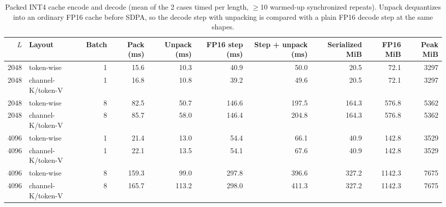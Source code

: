 \begin{table}[!htb]
\centering
\scriptsize
\setlength{\tabcolsep}{3.5pt}
\caption{Packed INT4 cache encode and decode (mean of the 2 cases timed per length, $\geq$10 warmed-up synchronized repeats). Unpack dequantizes into an ordinary FP16 cache before SDPA, so the decode step with unpacking is compared with a plain FP16 decode step at the same shapes.}
\label{tab:t2ccodec}
\begin{adjustbox}{max width=\linewidth}
\begin{tabular}{rlrrrrrrrr}
\toprule
$L$ & Layout & Batch & Pack (ms) & Unpack (ms) & FP16 step (ms) & Step + unpack (ms) & Serialized MiB & FP16 MiB & Peak MiB \\
\midrule
2048 & token-wise & 1 & 15.6 & 10.3 & 40.9 & 50.0 & 20.5 & 72.1 & 3297 \\
2048 & channel-K/token-V & 1 & 16.8 & 10.8 & 39.2 & 49.6 & 20.5 & 72.1 & 3297 \\
2048 & token-wise & 8 & 82.5 & 50.7 & 146.6 & 197.5 & 164.3 & 576.8 & 5362 \\
2048 & channel-K/token-V & 8 & 85.7 & 58.0 & 146.4 & 204.8 & 164.3 & 576.8 & 5362 \\
4096 & token-wise & 1 & 21.4 & 13.0 & 54.4 & 66.1 & 40.9 & 142.8 & 3529 \\
4096 & channel-K/token-V & 1 & 22.1 & 13.5 & 54.1 & 67.6 & 40.9 & 142.8 & 3529 \\
4096 & token-wise & 8 & 159.3 & 99.0 & 297.8 & 396.6 & 327.2 & 1142.3 & 7675 \\
4096 & channel-K/token-V & 8 & 165.7 & 113.2 & 298.0 & 411.3 & 327.2 & 1142.3 & 7675 \\
\bottomrule
\end{tabular}
\end{adjustbox}
\end{table}
